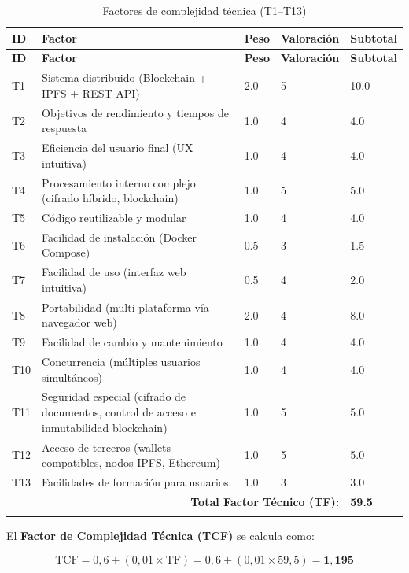 \documentclass[11pt, a4paper]{article}
\begin{document}
\begin{longtable}{|p{0.8cm}|p{7.5cm}|p{1.3cm}|p{1.8cm}|p{2cm}|}
\hline
\textbf{ID} & \textbf{Factor} & \textbf{Peso} & \textbf{Valoración} & \textbf{Subtotal} \\
\hline
\endfirsthead
\hline
\textbf{ID} & \textbf{Factor} & \textbf{Peso} & \textbf{Valoración} & \textbf{Subtotal} \\
\hline
\endhead
T1 & Sistema distribuido (Blockchain + IPFS + REST API) & 2.0 & 5 & 10.0 \\
\hline
T2 & Objetivos de rendimiento y tiempos de respuesta & 1.0 & 4 & 4.0 \\
\hline
T3 & Eficiencia del usuario final (UX intuitiva) & 1.0 & 4 & 4.0 \\
\hline
T4 & Procesamiento interno complejo (cifrado híbrido, blockchain) & 1.0 & 5 & 5.0 \\
\hline
T5 & Código reutilizable y modular & 1.0 & 4 & 4.0 \\
\hline
T6 & Facilidad de instalación (Docker Compose) & 0.5 & 3 & 1.5 \\
\hline
T7 & Facilidad de uso (interfaz web intuitiva) & 0.5 & 4 & 2.0 \\
\hline
T8 & Portabilidad (multi-plataforma vía navegador web) & 2.0 & 4 & 8.0 \\
\hline
T9 & Facilidad de cambio y mantenimiento & 1.0 & 4 & 4.0 \\
\hline
T10 & Concurrencia (múltiples usuarios simultáneos) & 1.0 & 4 & 4.0 \\
\hline
T11 & Seguridad especial (cifrado de documentos, control de acceso e inmutabilidad blockchain) & 1.0 & 5 & 5.0 \\
\hline
T12 & Acceso de terceros (wallets compatibles, nodos IPFS, Ethereum) & 1.0 & 5 & 5.0 \\
\hline
T13 & Facilidades de formación para usuarios & 1.0 & 3 & 3.0 \\
\hline
\multicolumn{4}{|r|}{\textbf{Total Factor Técnico (TF):}} & \textbf{59.5} \\
\hline
\caption{Factores de complejidad técnica (T1--T13)}
\end{longtable}

\vspace{0.5em}
\noindent El \textbf{Factor de Complejidad Técnica (TCF)} se calcula como:

\begin{equation}
\text{TCF} = 0{,}6 + (0{,}01 \times \text{TF}) = 0{,}6 + (0{,}01 \times 59{,}5) = \mathbf{1{,}195}
\end{equation}
\end{document}
